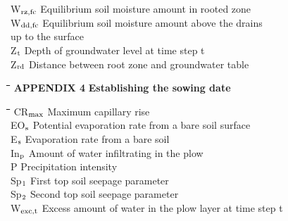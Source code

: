 \documentclass[11pt]{article}
\begin{document}
\begin{tabbing}
W$_{{\rm rz,fc}}$\> \> Equilibrium soil moisture amount in rooted zone\> \> \> \> \> \> \> \> [cm]\\
W$_{{\rm dd,fc}}$\> \> Equilibrium soil moisture amount above the drains \\
\>\> up to the surface\> \> \> \> \> \> \> \> [cm]\\
Z$_{{\rm t}}$\> \> Depth of groundwater level at time step t\> \> \> \> \> \> \> \> [cm]\\
Z$_{{\rm rd}}$\> \> Distance between root zone and groundwater table\> \> \> \> \> \> \> \> [cm]
\end{tabbing}

\bigskip
\bigskip
\nwln
\begin{tabbing}
\hspace{1.27cm}\=\hspace{1.27cm}\=\hspace{1.27cm}\=\hspace{1.27cm}\=%
\hspace{1.27cm}\=\hspace{1.27cm}\=\hspace{1.27cm}\=\hspace{1.27cm}\=%
\hspace{1.27cm}\=\hspace{1.27cm}\=\kill
{\bf {\large APPENDIX 4}}\> \> \> {\bf {\large Establishing the sowing date }}
\end{tabbing}
\nwln
\begin{tabbing}
\hspace{1.27cm}\=\hspace{1.27cm}\=\hspace{1.27cm}\=\hspace{1.27cm}\=%
\hspace{1.27cm}\=\hspace{1.27cm}\=\hspace{1.27cm}\=\hspace{1.27cm}\=%
\hspace{1.27cm}\=\hspace{1.27cm}\=\kill
CR$_{{\rm max}}$\> \> Maximum capillary rise\> \> \> \> \> \> \> \> [cm d$^{{\rm -1}}$]\\
EO$_{{\rm s}}$\> \> Potential evaporation rate from a bare soil surface\> \> \> \> \> \> \> \> [cm]\\
E$_{{\rm s}}$\> \> Evaporation rate from a bare soil \> \> \> \> \> \> \> \> [cm d$^{{\rm -1}}$]\\
In$_{{\rm p}}$\> \> Amount of water infiltrating in the plow\> \> \> \> \> \> \> \> [cm]\\
P\> \> Precipitation intensity\> \> \> \> \> \> \> \> [cm d$^{{\rm -1}}$]\\
Sp$_{{\rm 1}}$\> \> First top soil seepage parameter\> \> \> \> \> \> \> \> [-]\\
Sp$_{{\rm 2}}$\> \> Second top soil seepage parameter\> \> \> \> \> \> \> \> [-]\\
W$_{{\rm exc,t}}$\> \> Excess amount of water in the plow layer at time step t\> \> \> \> \> \> \> \> [cm]
\end{tabbing}
\end{document}

